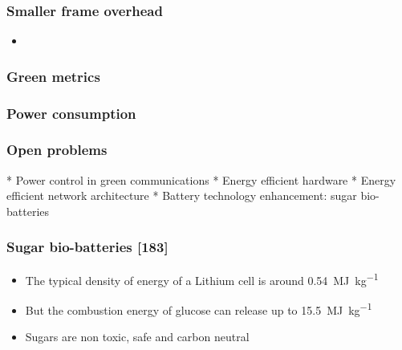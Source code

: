 \documentclass[a4paper,12pt,handout]{beamer}
\begin{document}
\begin{frame}
	\frametitle{Smaller frame overhead}

	\begin{itemize}
		\item 
	\end{itemize}
\end{frame}
\begin{frame}
	\frametitle{Green metrics}
\end{frame}
\note{}
\begin{frame}
	\frametitle{Power consumption}
\end{frame}
\note{}
\begin{frame}
\frametitle{Open problems}

* Power control in green communications
* Energy efficient hardware
* Energy efficient network architecture
* Battery technology enhancement: sugar bio-batteries

\end{frame}
\note{}
\begin{frame}
\frametitle{Sugar bio-batteries [183]}

\begin{itemize}

	\item The typical density of energy of a Lithium cell is around 
	\SI{0.54}{\mega\joule\per\kilogram}

	\item But the combustion energy of glucose can release up to 
	\SI{15.5}{\mega\joule\per\kilogram}

	\item Sugars are non toxic, safe and carbon neutral

\end{itemize}
\end{frame}
\note{}
\end{document}
